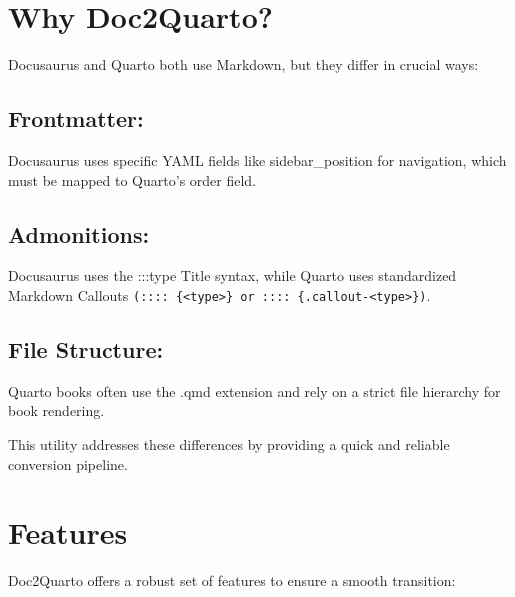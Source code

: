 \documentclass[
  letterpaper,
  DIV=11,
  numbers=noendperiod]{scrreprt}
\begin{document}
\chapter{Why Doc2Quarto?}\label{why-doc2quarto}

Docusaurus and Quarto both use Markdown, but they differ in crucial
ways:

\section{Frontmatter:}\label{frontmatter}

Docusaurus uses specific YAML fields like sidebar\_position for
navigation, which must be mapped to Quarto's order field.

\section{Admonitions:}\label{admonitions}

Docusaurus uses the :::type Title syntax, while Quarto uses standardized
Markdown Callouts
\texttt{(::::\ \{\textless{}type\textgreater{}\}\ or\ ::::\ \{.callout-\textless{}type\textgreater{}\})}.

\section{File Structure:}\label{file-structure}

Quarto books often use the .qmd extension and rely on a strict file
hierarchy for book rendering.

This utility addresses these differences by providing a quick and
reliable conversion pipeline.

\chapter{Features}\label{features}

Doc2Quarto offers a robust set of features to ensure a smooth
transition:
\end{document}

